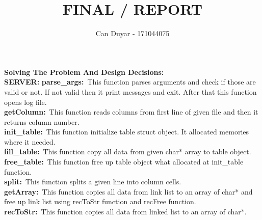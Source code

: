 \documentclass[a4 paper]{article}
\title{FINAL / REPORT}
\author{ Can Duyar - 171044075}
\begin{document}
\date{}
\maketitle

{\color{red}\large\textbf {Solving The Problem And Design Decisions:}}\newline\\

\textbf{{\large SERVER:}}\newline
\newline
\textbf{parse\_args:}\newline\
\phantom{beta}This function parses arguments and check if those are valid or not. If not valid then it print messages and exit. After that this function opens log file.
\newline\\
\textbf{getColumn:}\newline\
\phantom{beta}This function reads columns from first line of given file and then it returns column number.
\newline\\
\textbf{init\_table:}\newline\
\phantom{beta}This function initialize table struct object. It allocated memories where it needed.
\newline\\
\textbf{fill\_table:}\newline\
\phantom{beta}This function copy all data from given char* array to table object.
\newline\\
\textbf{free\_table:}\newline\
\phantom{beta}This function free up table object what allocated at init\_table function.
\newline\\
\textbf{split:}\newline\
\phantom{beta}This function splits a given line into column cells.
\newline\\
\textbf{getArray:}\newline\
\phantom{beta}This function copies all data from link list to an array of char* and free up link list using recToStr function and recFree function.
\newline\\
\textbf{recToStr:}\newline\
\phantom{beta}This function copies all data from linked list to an array of char*.
\newline\\
\end{document}

